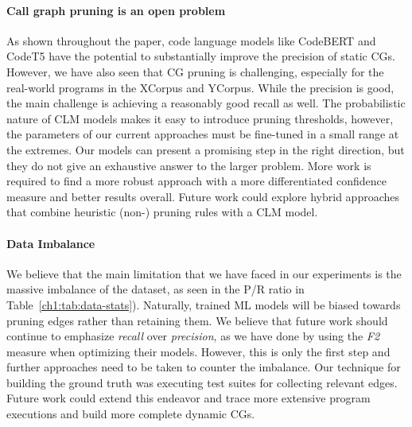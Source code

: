 \paragraph{Call graph pruning is an open problem}
As shown throughout the paper, code language models like CodeBERT and CodeT5 have the potential to substantially improve the precision of static CGs.
However, we have also seen that CG pruning is challenging, especially for the real-world programs in the XCorpus and YCorpus.
While the precision is good, the main challenge is achieving a reasonably good recall as well.
The probabilistic nature of CLM models makes it easy to introduce pruning thresholds, however, the parameters of our current approaches must be fine-tuned in a small range at the extremes.
Our models can present a promising step in the right direction, but they do not give an exhaustive answer to the larger problem.
More work is required to find a more robust approach with a more differentiated confidence measure and better results overall.
Future work could explore hybrid approaches that combine heuristic (non-) pruning rules with a CLM model.

\paragraph{Data Imbalance}
We believe that the main limitation that we have faced in our experiments is the massive imbalance of the dataset, as seen in the P/R ratio in Table~\ref{ch1:tab:data-stats}).
Naturally, trained ML models will be biased towards pruning edges rather than retaining them.
We believe that future work should continue to emphasize \emph{recall} over \emph{precision}, as we have done by using the \emph{F2} measure when optimizing their models.
However, this is only the first step and further approaches need to be taken to counter the imbalance.
Our technique for building the ground truth was executing test suites for collecting relevant edges.
Future work could extend this endeavor and trace more extensive program executions and build more complete dynamic CGs.

